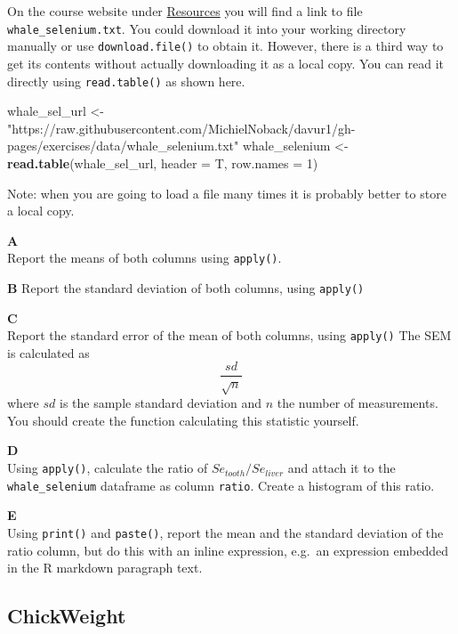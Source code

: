 \documentclass[]{book}
\newenvironment{Shaded}{\begin{snugshade}}{\end{snugshade}}
\newcommand{\DataTypeTok}[1]{\textcolor[rgb]{0.13,0.29,0.53}{#1}}
\newcommand{\DecValTok}[1]{\textcolor[rgb]{0.00,0.00,0.81}{#1}}
\newcommand{\KeywordTok}[1]{\textcolor[rgb]{0.13,0.29,0.53}{\textbf{#1}}}
\newcommand{\NormalTok}[1]{#1}
\newcommand{\StringTok}[1]{\textcolor[rgb]{0.31,0.60,0.02}{#1}}
\begin{document}
On the course website under \href{https://michielnoback.github.io/bincourses/course_contents/davur/resources.html}{Resources} you will find a link to file \texttt{whale\_selenium.txt}. You could download it into your working directory manually or use \texttt{download.file()} to obtain it. However, there is a third way to get its contents without actually downloading it as a local copy. You can read it directly using \texttt{read.table()} as shown here.

\begin{Shaded}
\begin{Highlighting}[]
\NormalTok{whale_sel_url <-}\StringTok{ "https://raw.githubusercontent.com/MichielNoback/davur1/gh-pages/exercises/data/whale_selenium.txt"}
\NormalTok{whale_selenium <-}\StringTok{ }\KeywordTok{read.table}\NormalTok{(whale_sel_url,}
    \DataTypeTok{header =}\NormalTok{ T,}
    \DataTypeTok{row.names =} \DecValTok{1}\NormalTok{)}
\end{Highlighting}
\end{Shaded}

Note: when you are going to load a file many times it is probably better to store a local copy.

\textbf{A}\\
Report the means of both columns using \texttt{apply()}.

\textbf{B}
Report the standard deviation of both columns, using \texttt{apply()}

\textbf{C}\\
Report the standard error of the mean of both columns, using \texttt{apply()} The SEM is calculated as \[\frac{sd}{\sqrt{n}}\] where \(sd\) is the sample standard deviation and \(n\) the number of measurements. You should create the function calculating this statistic yourself.

\textbf{D}\\
Using \texttt{apply()}, calculate the ratio of \(Se_{tooth} / Se_{liver}\) and attach it to the \texttt{whale\_selenium} dataframe as column \texttt{ratio}. Create a histogram of this ratio.

\textbf{E}\\
Using \texttt{print()} and \texttt{paste()}, report the mean and the standard deviation of the ratio column, but do this with an inline expression, e.g.~an expression embedded in the R markdown paragraph text.

\hypertarget{chickweight}{%
\subsection{ChickWeight}\label{chickweight}}
\end{document}
